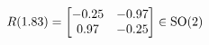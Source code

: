 \documentclass[preview]{standalone}
\begin{document}
\begin{align*}
\special{dvisvgm:raw <g id='unique000'>}R(1.83) = \begin{bmatrix} -0.25 & -0.97 \\ 0.97 & -0.25 \end{bmatrix} \in \text{SO}(2)\special{dvisvgm:raw </g>}
\end{align*}
\end{document}
